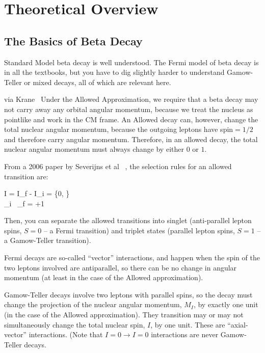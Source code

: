 


\clearpage
\chapter{Theoretical Overview}
\label{theory_chapter}

\section{The Basics of Beta Decay}
	Standard Model beta decay is well understood.  The Fermi model of beta decay is in all the textbooks, but you have to dig slightly harder to understand Gamow-Teller or mixed decays, all of which are relevant here.  
	
	via Krane~\cite{krane}
	Under the Allowed Approximation, we require that a beta decay may not carry away any orbital angular momentum, because we treat the nucleus as pointlike  and work in the CM frame.  An Allowed decay can, however, change the total nuclear angular momentum, because the outgoing leptons have spin$=1/2$ and therefore carry angular momentum.  Therefore, in an allowed decay, the total nuclear angular momentum must always change by either $0$ or $1$.  
	
	From a 2006 paper by Severijns et al ~\cite{severijns_beck_cuncic_2006}, the selection rules for an allowed transition are:
	
\bea
\Delta I = I_f - I_i = \{0, \} \\ 
\hat{\Pi}_i \, \hat{\Pi}_f = +1
\eea

	Then, you can separate the allowed transitions into singlet (anti-parallel lepton spins, $S=0$ -- a Fermi transition) and triplet states (parallel lepton spins, $S=1$ -- a Gamow-Teller transition).
	
	
	Fermi decays are so-called ``vector'' interactions, and happen when the spin of the two leptons involved are antiparallel, so there can be no change in angular momentum (at least in the case of the Allowed approximation).  
	
	Gamow-Teller decays involve two leptons with parallel spins, so the decay must change the projection of the nuclear angular momentum, $M_I$, by exactly one unit (in the case of the Allowed approximation).  They transition may or may not simultaneously change the total nuclear spin, $I$, by one unit.  These are ``axial-vector'' interactions.  (Note that $I=0 \rightarrow I=0$ interactions are never Gamow-Teller decays.  
	
